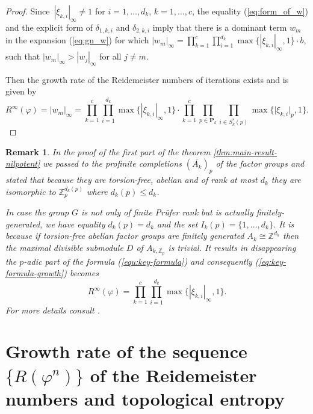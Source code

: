 \documentclass[12pt, a4paper]{amsart}
\def\Z{{\mathbb Z}}
\newtheorem{remark}[theorem]{Remark}
\begin{document}
\begin{proof}
Since~$|\xi_{k,i}|_{\infty}\neq 1 $ for  $i=1,\dots,d_k$,  $k=1, \dots, c $,
 the equality (\ref{eq:form_of_w}) and the explicit form of $\delta_{1,k,i}$ and
  $\delta_{2,k,i}$ imply that
there is a dominant term $w_m$ in the expansion (\ref{eq:gn_w}) for which
$|w_m|_{\infty}=\prod_{k=1}^{c} \prod_{i=1}^{d_k} \max\{|\xi_{k,i}|_\infty,1\}\cdot b $, such that
$|w_m|_{\infty}>|w_j|_{\infty}$ for all $j\neq m$.

Then the growth rate of the  Reidemeister numbers of iterations exists and is given by
  $$R^{\infty}(\varphi)=|w_m|_{\infty}=\prod_{k=1}^{c} \prod_{i=1}^{d_k} \max\{|\xi_{k,i}|_\infty,1\}\cdot\prod_{k=1}^{c}\prod_{p \in \mathbf{P}_k} \prod_{i \in
      S^*_k(p)} \max \{ \lvert \xi_{k,i} \rvert_p, 1\}.$$
\end{proof}

\begin{remark}\label{thm:growth-reidemeister-finitely-generated}
  In the proof of the first part of the theorem \ref{thm:main-result-nilpotent} we passed
  to the profinite completions $(\overline{A_k})_p$ of the factor groups
  and stated that because they are torsion-free, abelian and of rank at most $d_k$
  they are isomorphic to $\mathbb{Z}_p^{d_k(p)}$ where $d_k(p) \leq d_k$.

  In case the group $G$ is not only of finite Pr\"ufer rank but is actually finitely-generated,
  we have equality $d_k(p) = d_k$ and the set $I_k(p) = \{1, \dots, d_k\}$.
  It is because if torsion-free abelian factor groups are finitely generated $A_k \cong \Z^{d_k}$
  then the maximal divisible submodule $D$ of $A_{k,\Z_p}$ is trivial.
  It results in disappearing the $p$-adic part of the formula (\ref{equ:key-formula})
  and consequently (\ref{eq:key-formula-growth}) becomes
  \begin{equation}\label{eq:growth-reideiester-finitely-generated}
    R^{\infty}(\varphi) = \prod_{k=1}^{c} \prod_{i=1}^{d_k} \max\{|\xi_{k,i}|_\infty,1\}.
  \end{equation}
  For more details consult \cite[Theorem 1.4]{FelsKlop}.
\end{remark}


\bigskip
\section{Growth rate of the sequence $\{R(\varphi^n)\}$ of the Reidemeister numbers and topological entropy}\label{sec:growth-entropy}
\end{document}
